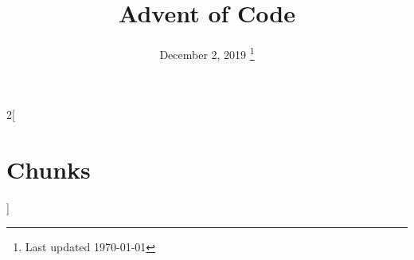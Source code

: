 \documentclass[a4paper,nobib,titlepage,xelatex]{tufte-book}
\title{Advent of Code}
\date{%
  December 2, 2019
  \thanks{Last updated \today}
}
\begin{document}
\frontmatter
\maketitle
\tableofcontents
\mainmatter
\newpage


\backmatter
\newpage
\begin{multicols}{2}[\chapter*{Chunks}]
  \nowebchunks
\end{multicols}




\newpage
\listoftodos[To-Do]
\end{document}
